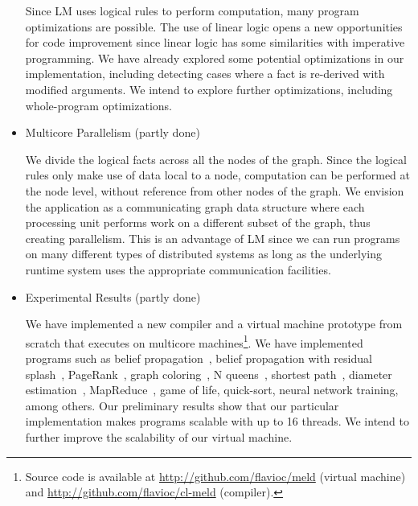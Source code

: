 \begin{itemize}
   Since LM uses logical rules to perform computation, many program optimizations are possible. The use of linear logic
   opens a new opportunities for code improvement since linear logic has some similarities with imperative programming.
   We have already explored some potential optimizations in our implementation, including detecting cases where a fact
   is re-derived with modified arguments. We intend to explore further optimizations, including whole-program optimizations.
   
   \item Multicore Parallelism (partly done)
   
   We divide the logical facts across all the nodes of the graph. Since the
   logical rules only make use of data local to a node, computation can be performed at the
   node level, without reference from other nodes of the graph. We envision the application as
   a communicating graph data structure where each processing unit performs work on a different subset of the graph,
   thus creating parallelism. This is an advantage of LM since we can run programs on many different types
   of distributed systems as long as the underlying runtime system uses the appropriate communication facilities.

   \item Experimental Results (partly done)

   We have implemented a new compiler and a virtual machine prototype from scratch that executes on multicore machines\footnote{Source code is available at \url{http://github.com/flavioc/meld} (virtual machine) and \url{http://github.com/flavioc/cl-meld} (compiler).}.
   We have implemented programs such as belief propagation~\cite{Gonzalez+al:aistats09paraml},
   belief propagation with residual splash~\cite{Gonzalez+al:aistats09paraml}, PageRank~\cite{Page:2001:MNR},
   graph coloring~\cite{PSP:2032868}, N queens~\cite{8queens}, shortest path~\cite{Dijkstra}, diameter estimation~\cite{5234320}, MapReduce~\cite{Dean:2008:MSD:1327452.1327492}, game of life, quick-sort, neural network training, among others.
   Our preliminary results show that our particular implementation makes programs scalable with up to 16 threads. We intend to
   further improve the scalability of our virtual machine.
   
\end{itemize}
